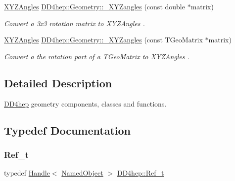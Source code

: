 \begin{DoxyCompactItemize}
\hyperlink{namespace_d_d4hep_1_1_geometry_ab195c63789d4928d291d3b5522151aaa}{X\+Y\+Z\+Angles} \hyperlink{group___d_d4_h_e_p___g_e_o_m_e_t_r_y_ga446608ca1668ae2b3ad24c3ea5b2bc1e}{D\+D4hep\+::\+Geometry\+::\+\_\+\+X\+Y\+Zangles} (const double $\ast$matrix)
\begin{DoxyCompactList}\small\item\em Convert a 3x3 rotation matrix to X\+Y\+Z\+Angles . \end{DoxyCompactList}\item 
\hyperlink{namespace_d_d4hep_1_1_geometry_ab195c63789d4928d291d3b5522151aaa}{X\+Y\+Z\+Angles} \hyperlink{group___d_d4_h_e_p___g_e_o_m_e_t_r_y_gaf4d63a5a06b85c2a65143cc5f15a81fe}{D\+D4hep\+::\+Geometry\+::\+\_\+\+X\+Y\+Zangles} (const T\+Geo\+Matrix $\ast$matrix)
\begin{DoxyCompactList}\small\item\em Convert a the rotation part of a T\+Geo\+Matrix to X\+Y\+Z\+Angles . \end{DoxyCompactList}\end{DoxyCompactItemize}


\subsection{Detailed Description}
\hyperlink{namespace_d_d4hep}{D\+D4hep} geometry components, classes and functions. 



\subsection{Typedef Documentation}
\hypertarget{group___d_d4_h_e_p___g_e_o_m_e_t_r_y_ga40af83be6718bb8828a3d83dc7f8c930}{}\label{group___d_d4_h_e_p___g_e_o_m_e_t_r_y_ga40af83be6718bb8828a3d83dc7f8c930} 
\subsubsection{\texorpdfstring{Ref\+\_\+t}{Ref\_t}}
{\footnotesize\ttfamily typedef \hyperlink{class_d_d4hep_1_1_handle}{Handle}$<$ \hyperlink{class_d_d4hep_1_1_named_object}{Named\+Object} $>$ \hyperlink{group___d_d4_h_e_p___g_e_o_m_e_t_r_y_ga40af83be6718bb8828a3d83dc7f8c930}{D\+D4hep\+::\+Ref\+\_\+t}}



